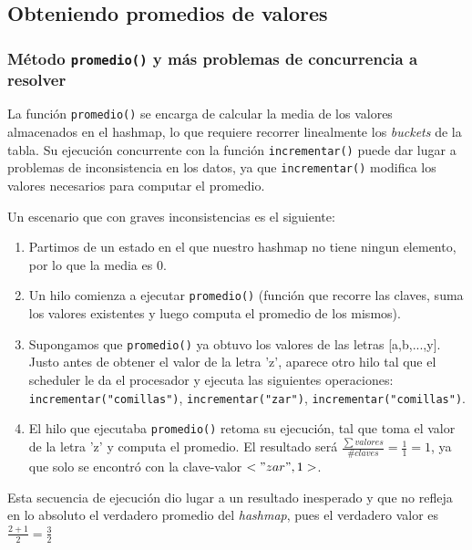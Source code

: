 \documentclass[a4paper]{article}
\begin{document}
    \subsection{Obteniendo promedios de valores}

    \subsubsection{Método \texttt{promedio()} y más problemas de concurrencia a resolver}

    La función \texttt{promedio()} se encarga de calcular la media de los valores almacenados en el hashmap, lo que requiere recorrer linealmente los \textit{buckets} de la tabla. Su ejecución concurrente con la función \texttt{incrementar()} puede dar lugar a problemas de inconsistencia en los datos, ya que \texttt{incrementar()} modifica los valores necesarios para computar el promedio.

    Un escenario que con graves inconsistencias es el siguiente:

    \begin{enumerate}
    \item Partimos de un estado en el que nuestro hashmap no tiene ningun elemento, por lo que la media es 0.

    \item Un hilo comienza a ejecutar \texttt{promedio()} (función que recorre las claves, suma los valores existentes y luego computa el promedio de los mismos).

    \item Supongamos que \texttt{promedio()} ya obtuvo los valores de las letras [a,b,...,y]. Justo antes de obtener el valor de la letra 'z', aparece otro hilo tal que el scheduler le da el procesador y ejecuta las siguientes operaciones: \texttt{incrementar("comillas")}, \texttt{incrementar("zar")}, \texttt{incrementar("comillas")}.

    \item El hilo que ejecutaba \texttt{promedio()} retoma su ejecución, tal que toma el valor de la letra 'z' y computa el promedio. El resultado será $\frac{\sum valores}{\#claves} = \frac{1}{1} = 1$, ya que solo se encontró con la clave-valor $<"zar", 1>$.
    \end{enumerate}

    Esta secuencia de ejecución dio lugar a un resultado inesperado y que no refleja en lo absoluto el verdadero promedio del \textit{hashmap}, pues el verdadero valor es $\frac{2+1}{2} = \frac{3}{2}$
\end{document}

